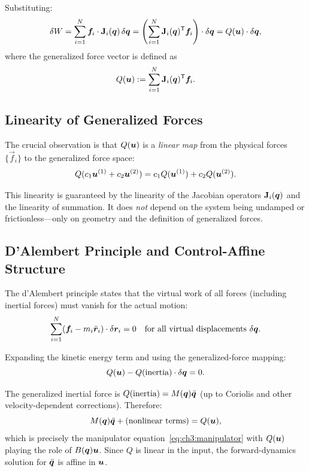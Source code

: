 Substituting:
\begin{equation}
\delta W = \sum_{i=1}^N \bm{f}_i \cdot \mathbf{J}_i(\bm{q})\,\delta\bm{q}
= \left(\sum_{i=1}^N \mathbf{J}_i(\bm{q})^{\mathsf{T}}\bm{f}_i\right) \cdot \delta\bm{q}
= Q(\bm{u}) \cdot \delta\bm{q},
\label{eq:ch3:virtual-work-generalized}
\end{equation}
where the generalized force vector is defined as
\begin{equation}
Q(\bm{u}) := \sum_{i=1}^N \mathbf{J}_i(\bm{q})^{\mathsf{T}}\bm{f}_i.
\label{eq:ch3:generalized-force-def}
\end{equation}

\subsection{Linearity of Generalized Forces}

The crucial observation is that $Q(\bm{u})$ is a \emph{linear map} from the physical forces
$\{\vec{f}_i\}$ to the generalized force space:
\begin{equation}
Q(c_1\bm{u}^{(1)} + c_2\bm{u}^{(2)}) = c_1 Q(\bm{u}^{(1)}) + c_2 Q(\bm{u}^{(2)}).
\label{eq:ch3:generalized-linearity}
\end{equation}

This linearity is guaranteed by the linearity of the Jacobian operators $\mathbf{J}_i(\bm{q})$ and
the linearity of summation. It does \emph{not} depend on the system being undamped or frictionless---only
on geometry and the definition of generalized forces.

\subsection{D'Alembert Principle and Control-Affine Structure}

The d'Alembert principle states that the virtual work of all forces (including inertial forces)
must vanish for the actual motion:
\begin{equation}
\sum_{i=1}^N (\bm{f}_i - m_i\ddot{\bm{r}}_i) \cdot \delta\bm{r}_i = 0
\quad\text{for all virtual displacements } \delta\bm{q}.
\label{eq:ch3:dalembert}
\end{equation}

Expanding the kinetic energy term and using the generalized-force mapping:
\begin{equation}
Q(\bm{u}) - Q(\text{inertia}) \cdot \delta\bm{q} = 0.
\label{eq:ch3:dalembert-generalized}
\end{equation}

The generalized inertial force is $Q(\text{inertia}) = M(\bm{q})\ddot{\bm{q}}$ (up to Coriolis and other
velocity-dependent corrections). Therefore:
\begin{equation}
M(\bm{q})\ddot{\bm{q}} + \text{(nonlinear terms)} = Q(\bm{u}),
\label{eq:ch3:dalembert-result}
\end{equation}
which is precisely the manipulator equation~\eqref{eq:ch3:manipulator} with $Q(\bm{u})$ playing
the role of $B(\bm{q})\bm{u}$. Since $Q$ is linear in the input, the forward-dynamics solution for
$\ddot{\bm{q}}$ is affine in $\bm{u}$.

